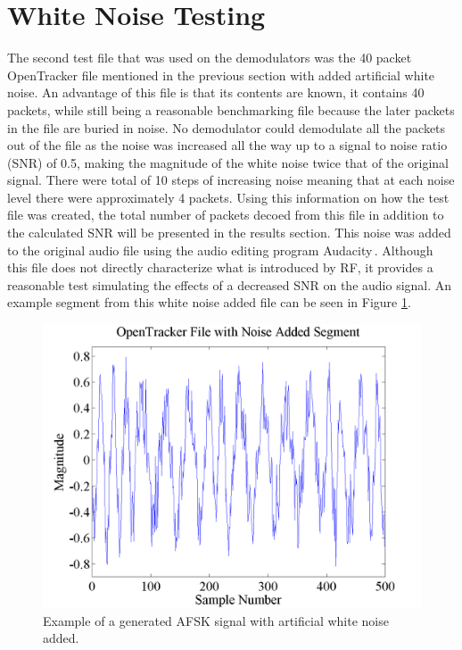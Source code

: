 \section{White Noise Testing}
The second test file that was used on the demodulators was the 40 packet OpenTracker file mentioned in the previous section with added artificial white noise. An advantage of this file is that its contents are known, it contains 40 packets, while still being a reasonable benchmarking file because the later packets in the file are buried in noise. No demodulator could demodulate all the packets out of the file as the noise was increased all the way up to a signal to noise ratio (SNR) of 0.5, making the magnitude of the white noise twice that of the original signal. There were total of 10 steps of increasing noise meaning that at each noise level there were approximately 4 packets. Using this information on how the test file was created, the total number of packets decoed from this file in addition to the calculated SNR will be presented in the results section. This noise was added to the original audio file using the audio editing program Audacity\,\cite{Mazzoni}. Although this file does not directly characterize what is introduced by RF, it provides a reasonable test simulating the effects of a decreased SNR on the audio signal. An example segment from this white noise added file can be seen in Figure \ref{OT3TestwNoiseSegment}.
\begin{figure}
  \centering
	\includegraphics[width=0.75\linewidth]{images/OpenTrackerFilewithNoiseAddedSegment.png} 
	\caption{Example of a generated AFSK signal with artificial white noise added.}
   \label{OT3TestwNoiseSegment}
\end{figure}
 
